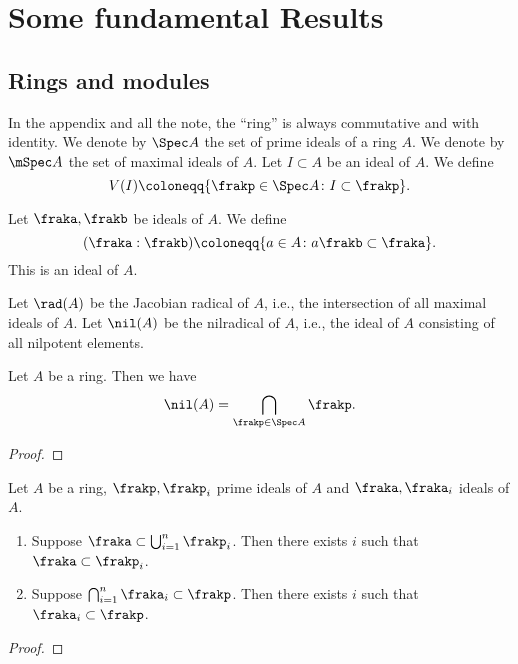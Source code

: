\section{Some fundamental Results}


\subsection{Rings and modules}

    In the appendix and all the note, the ``ring'' is always commutative and with identity.
    We denote by \(\Spec A\) the set of prime ideals of a ring \(A\).
    We denote by \(\mSpec A\) the set of maximal ideals of \(A\).
    Let \(I \subset A\) be an ideal of \(A\).
    We define 
    \[ V(I) \coloneqq \{ \frakp \in \Spec A \colon I \subset \frakp\}. \]

    Let \(\fraka,\frakb\) be ideals of \(A\).
    We define 
    \[ (\fraka : \frakb) \coloneqq \{ a \in A \colon a\frakb \subset \fraka\}. \]
    This is an ideal of \(A\).
    
    Let \(\rad(A)\) be the Jacobian radical of \(A\), i.e., the intersection of all maximal ideals of \(A\).
    Let \(\nil(A)\) be the nilradical of \(A\), i.e., the ideal of \(A\) consisting of all nilpotent elements.
    
    \begin{proposition}
        Let \(A\) be a ring.
        Then we have 
        \[ \nil(A) = \bigcap_{\frakp \in \Spec A} \frakp. \]
    \end{proposition}
    \begin{proof}
    \end{proof}

    \begin{proposition}\label{prop: prime avoidance lemma primity of prime ideals}
        Let $A$ be a ring, $\frakp,\frakp_i$ prime ideals of $A$ and \(\fraka,\fraka_i\) ideals of $A$. 
        \begin{enumerate}
            \item Suppose \(\fraka \subset \bigcup_{i=1}^n \frakp_i\). 
            Then there exists \(i\) such that \(\fraka \subset \frakp_i\).
            \item Suppose \(\bigcap_{i=1}^n \fraka_i \subset \frakp\). 
            Then there exists \(i\) such that \(\fraka_i \subset \frakp\).
        \end{enumerate}
    \end{proposition}
    \begin{proof}
    \end{proof}

